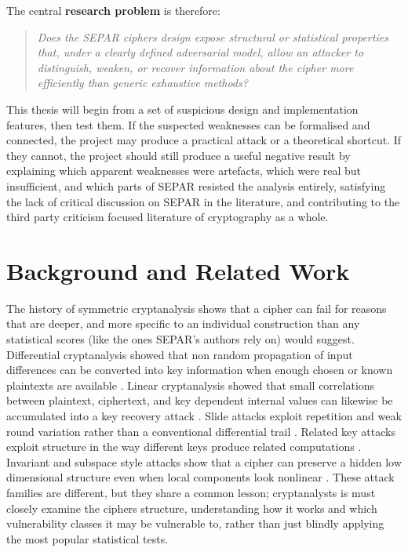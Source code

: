 \documentclass[11pt]{article}
\begin{document}
\noindent The central \textbf{research problem} is therefore:

\begin{quote}
\textit{Does the SEPAR ciphers design expose structural or statistical properties that, under a clearly defined adversarial model, allow an attacker to distinguish, weaken, or recover information about the cipher more efficiently than generic exhaustive methods?}
\end{quote}

This thesis will begin from a set of suspicious design and implementation features, then test them. If the suspected weaknesses can be formalised and connected, the project may produce a practical attack or a theoretical shortcut. If they cannot, the project should still produce a useful negative result by explaining which apparent weaknesses were artefacts, which were real but insufficient, and which parts of SEPAR resisted the analysis entirely, satisfying the lack of critical discussion on SEPAR in the literature, and contributing to the third party criticism focused literature of cryptography as a whole.\\



\section{Background and Related Work}

The history of symmetric cryptanalysis shows that a cipher can fail for reasons that are deeper, and more specific to an individual construction than any statistical scores (like the ones SEPAR's authors rely on) would suggest. Differential cryptanalysis showed that non random propagation of input differences can be converted into key information when enough chosen or known plaintexts are available \cite{BihamShamir1991,Heys2002}. Linear cryptanalysis showed that small correlations between plaintext, ciphertext, and key dependent internal values can likewise be accumulated into a key recovery attack \cite{Matsui1993,MatsuiYamagishi1992}. Slide attacks exploit repetition and weak round variation rather than a conventional differential trail \cite{BiryukovWagner1999}. Related key attacks exploit structure in the way different keys produce related computations \cite{Biham1994}. Invariant and subspace style attacks show that a cipher can preserve a hidden low dimensional structure even when local components look nonlinear \cite{Guo2016}. These attack families are different, but they share a common lesson; cryptanalysts is must closely examine the ciphers structure, understanding how it works and which vulnerability classes it may be vulnerable to, rather than just blindly applying the most popular statistical tests.\\
\end{document}
